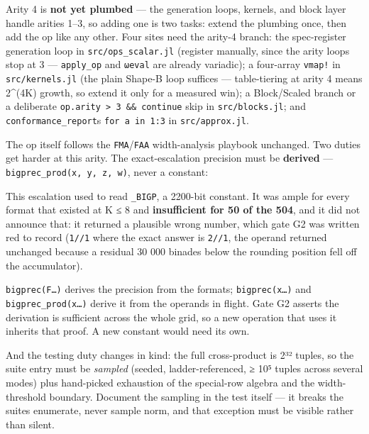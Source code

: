\label{1028380857650662652}{}


Arity 4 is \textbf{not yet plumbed} — the generation loops, kernels, and block layer handle arities 1–3, so adding one is two tasks: extend the plumbing once, then add the op like any other. Four sites need the arity-4 branch: the spec-register generation loop in \texttt{src/ops\_\allowbreak{}scalar.jl} (register manually, since the arity loops stop at 3 — \texttt{apply\_\allowbreak{}op} and \texttt{ωeval} are already variadic); a four-array \texttt{vmap!} in \texttt{src/kernels.jl} (the plain Shape-B loop suffices — table-tiering at arity 4 means 2{\textasciicircum}(4K) growth, so extend it only for a measured win); a Block/Scaled branch or a deliberate \texttt{op.arity > 3 \&\& continue} skip in \texttt{src/blocks.jl}; and \texttt{conformance\_\allowbreak{}report}{\textquotesingle}s \texttt{for a in 1:3} in \texttt{src/approx.jl}.



The op itself follows the \texttt{FMA}/\allowbreak\texttt{FAA} width-analysis playbook unchanged. Two duties get harder at this arity. The exact-escalation precision must be \textbf{derived} — \texttt{bigprec\_\allowbreak{}prod(\allowbreak{}x, y, z, w)}, never a constant:



\begin{tcolorbox}[toptitle=-1mm,bottomtitle=1mm,colback=admonition-warning!50!white,colframe=admonition-warning,title=\textbf{Derive the precision from the operands — never a constant}]
This escalation used to read \texttt{\_\allowbreak{}BIGP}, a 2200-bit constant. It was ample for every format that existed at K ≤ 8 and \textbf{insufficient for 50 of the 504}, and it did not announce that: it returned a plausible wrong number, which gate G2 was written red to record (\texttt{1//1} where the exact answer is \texttt{2//1}, the operand returned unchanged because a residual 30 000 binades below the rounding position fell off the accumulator).

\texttt{bigprec(F…)} derives the precision from the formats; \texttt{bigprec(x…)} and \texttt{bigprec\_\allowbreak{}prod(x…)} derive it from the operands in flight. Gate G2 asserts the derivation is sufficient across the whole grid, so a new operation that uses it inherits that proof. A new constant would need its own.

\end{tcolorbox}


And the testing duty changes in kind: the full cross-product is 2³² tuples, so the suite entry must be \emph{sampled} (seeded, ladder-referenced, ≥ 10⁵ tuples across several modes) plus hand-picked exhaustion of the special-row algebra and the width-threshold boundary. Document the sampling in the test itself — it breaks the suite{\textquotesingle}s {\textquotedbl}enumerate, never sample{\textquotedbl} norm, and that exception must be visible rather than silent.



